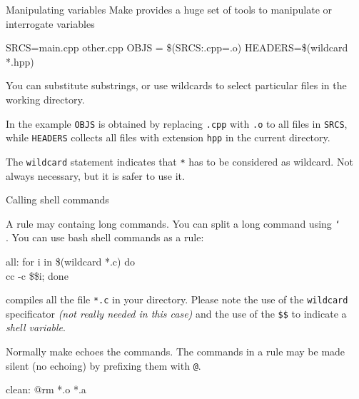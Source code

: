 \documentclass[10pt,aspectratio=169]{beamer}
\begin{document}
\begin{frame}{Manipulating variables}
Make provides a huge set of tools to manipulate or interrogate variables

\begin{semiverbatim}
SRCS=main.cpp other.cpp\newline
OBJS = \$(SRCS:.cpp=.o)\newline
HEADERS=\$(wildcard *.hpp)\newline
\end{semiverbatim}

You can substitute substrings, or use wildcards to select particular files in the working directory.
\medskip

In the example \texttt{OBJS} is obtained by replacing \texttt{.cpp} with \texttt{.o} to all files in \texttt{SRCS},
while \texttt{HEADERS} collects all files with extension \texttt{hpp} in the current directory.

The \texttt{wildcard} statement indicates that \texttt{*} has to be considered as wildcard. Not always necessary, but it is safer to use it.
\end{frame}

\begin{frame}{Calling shell commands}
    
    A rule may containg long commands. 
    You can split a long command using
    \texttt{\char`\\}. You can use bash shell commands as a rule:
    \begin{semiverbatim}
        all:\newline
        \phantom{xx}	for i in \$(wildcard *.c) do \\ \newline
        cc -c \$\$i; done  
    \end{semiverbatim}
    compiles all the file \texttt{*.c} in your directory. Please note the
    use of the \texttt{wildcard} specificator \emph{(not really needed in this
        case)} and the use of the \texttt{\$\$} 
    to indicate a \emph{shell variable}.
    \medskip
    
    Normally make echoes the commands. The commands in a rule may be made
    silent (no echoing) by prefixing them with \texttt{@}.
    \begin{semiverbatim}
        clean:\newline
        \phantom{xx}	@rm *.o *.a  
    \end{semiverbatim}
  \end{frame}
\end{document}
